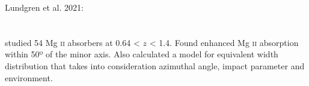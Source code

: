 \hline

Lundgren et al. 2021: \\
\citet{2021ApJ...913...50L} \\
\citep{2021ApJ...913...50L} \\
studied 54 Mg \textsc{ii} absorbers at 0.64 < $z$ < 1.4. Found enhanced
Mg \textsc{ii} absorption within 50º of the minor axis. Also calculated a model
for equivalent width distribution that takes into consideration azimuthal angle,
impact parameter and environment.
